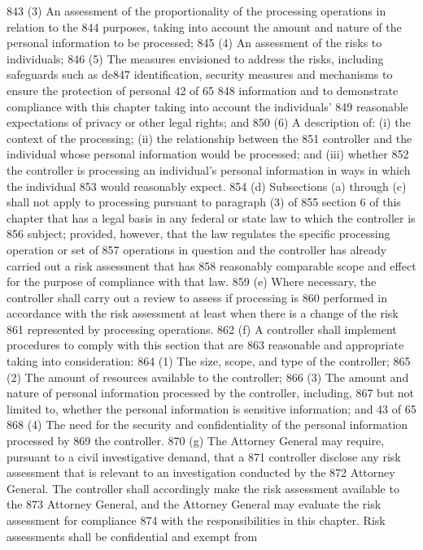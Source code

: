 843 (3) An assessment of the proportionality of the processing operations in relation to the
844 purposes, taking into account the amount and nature of the personal information to be processed;
845 (4) An assessment of the risks to individuals;
846 (5) The measures envisioned to address the risks, including safeguards such as de847 identification, security measures and mechanisms to ensure the protection of personal
42 of 65
848 information and to demonstrate compliance with this chapter taking into account the individuals’
849 reasonable expectations of privacy or other legal rights; and
850 (6) A description of: (i) the context of the processing; (ii) the relationship between the
851 controller and the individual whose personal information would be processed; and (iii) whether
852 the controller is processing an individual’s personal information in ways in which the individual
853 would reasonably expect.
854 (d) Subsections (a) through (c) shall not apply to processing pursuant to paragraph (3) of
855 section 6 of this chapter that has a legal basis in any federal or state law to which the controller is
856 subject; provided, however, that the law regulates the specific processing operation or set of
857 operations in question and the controller has already carried out a risk assessment that has
858 reasonably comparable scope and effect for the purpose of compliance with that law.
859 (e) Where necessary, the controller shall carry out a review to assess if processing is
860 performed in accordance with the risk assessment at least when there is a change of the risk
861 represented by processing operations.
862 (f) A controller shall implement procedures to comply with this section that are
863 reasonable and appropriate taking into consideration:
864 (1) The size, scope, and type of the controller;
865 (2) The amount of resources available to the controller;
866 (3) The amount and nature of personal information processed by the controller, including,
867 but not limited to, whether the personal information is sensitive information; and
43 of 65
868 (4) The need for the security and confidentiality of the personal information processed by
869 the controller.
870 (g) The Attorney General may require, pursuant to a civil investigative demand, that a
871 controller disclose any risk assessment that is relevant to an investigation conducted by the
872 Attorney General. The controller shall accordingly make the risk assessment available to the
873 Attorney General, and the Attorney General may evaluate the risk assessment for compliance
874 with the responsibilities in this chapter. Risk assessments shall be confidential and exempt from
